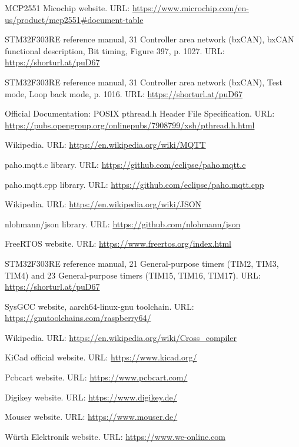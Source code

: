 \begin{thebibliography}{9}
MCP2551 Micochip website. URL: \url{ https://www.microchip.com/en-us/product/mcp2551#document-table}

STM32F303RE reference manual, 31 Controller area network (bxCAN), bxCAN functional description, Bit timing, Figure 397, p. 1027. URL: \url{https://shorturl.at/puD67}

STM32F303RE reference manual, 31 Controller area network (bxCAN), Test mode, Loop back mode, p. 1016. URL: \url{https://shorturl.at/puD67}

Official Documentation: POSIX pthread.h Header File Specification. URL: \url{https://pubs.opengroup.org/onlinepubs/7908799/xsh/pthread.h.html}

Wikipedia. URL: \url{https://en.wikipedia.org/wiki/MQTT}

paho.mqtt.c library. URL: \url{https://github.com/eclipse/paho.mqtt.c}

paho.mqtt.cpp library. URL: \url{https://github.com/eclipse/paho.mqtt.cpp}

Wikipedia. URL: \url{https://en.wikipedia.org/wiki/JSON}

nlohmann/json library. URL: \url{https://github.com/nlohmann/json}

FreeRTOS website. URL: \url{https://www.freertos.org/index.html}

STM32F303RE reference manual, 21 General-purpose timers (TIM2, TIM3, TIM4) and 23 General-purpose timers (TIM15, TIM16, TIM17). URL: \url{https://shorturl.at/puD67}

SysGCC website, aarch64-linux-gnu toolchain. URL: \url{https://gnutoolchains.com/raspberry64/}

Wikipedia. URL: \url{https://en.wikipedia.org/wiki/Cross_compiler}

KiCad official website. URL: \url{https://www.kicad.org/}

Pcbcart website. URL: \url{https://www.pcbcart.com/}

Digikey website. URL: \url{https://www.digikey.de/}

Mouser website. URL: \url{https://www.mouser.de/}

Würth Elektronik website. URL: \url{https://www.we-online.com}

\end{thebibliography}